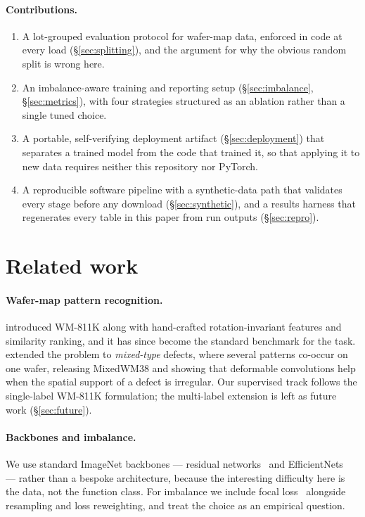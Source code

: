\documentclass[11pt,a4paper]{article}
\begin{document}
\paragraph{Contributions.}
\begin{enumerate}
  \item A lot-grouped evaluation protocol for wafer-map data, enforced in code
    at every load (\S\ref{sec:splitting}), and the argument for why the
    obvious random split is wrong here.
  \item An imbalance-aware training and reporting setup
    (\S\ref{sec:imbalance}, \S\ref{sec:metrics}), with four strategies
    structured as an ablation rather than a single tuned choice.
  \item A portable, self-verifying deployment artifact
    (\S\ref{sec:deployment}) that separates a trained model from the code that
    trained it, so that applying it to new data requires neither this
    repository nor PyTorch.
  \item A reproducible software pipeline with a synthetic-data path that
    validates every stage before any download (\S\ref{sec:synthetic}), and a
    results harness that regenerates every table in this paper from run
    outputs (\S\ref{sec:repro}).
\end{enumerate}

\section{Related work}

\paragraph{Wafer-map pattern recognition.}
\citet{wu2015wafer} introduced WM-811K along with hand-crafted
rotation-invariant features and similarity ranking, and it has since become the
standard benchmark for the task. \citet{wang2020mixedwm38} extended the problem
to \emph{mixed-type} defects, where several patterns co-occur on one wafer,
releasing MixedWM38 and showing that deformable convolutions help when the
spatial support of a defect is irregular. Our supervised track follows the
single-label WM-811K formulation; the multi-label extension is left as future
work (\S\ref{sec:future}).

\paragraph{Backbones and imbalance.}
We use standard ImageNet backbones --- residual
networks~\citep{he2016resnet} and EfficientNets~\citep{tan2019efficientnet} ---
rather than a bespoke architecture, because the interesting difficulty here is
the data, not the function class. For imbalance we include focal
loss~\citep{lin2017focal} alongside resampling and loss reweighting, and treat
the choice as an empirical question.
\end{document}
